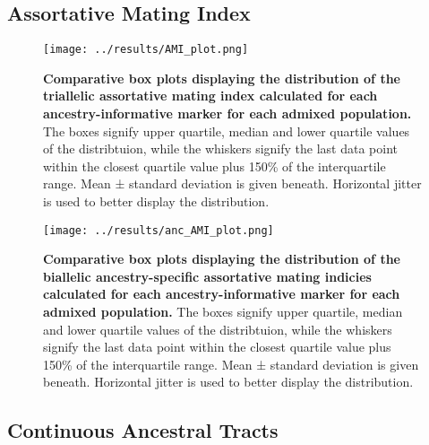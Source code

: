 \documentclass[11pt]{article}
\begin{document}
\subsection{Assortative Mating Index}


\begin{figure}[htb!]%
    \centering
    \texttt{[image: ../results/AMI\_plot.png]} 
    \vspace{.1cm}
    \caption{\textbf{
        Comparative box plots displaying the distribution of the triallelic assortative mating index calculated for each ancestry-informative marker for each admixed population.
    }
        The boxes signify upper quartile, median and lower quartile values of the distribtuion, while the whiskers signify the last data point within the closest quartile value plus 150\% of the interquartile range. Mean ± standard deviation is given beneath. Horizontal jitter is used to better display the distribution.
    }
\end{figure}



\begin{figure}[htb!]%
    \centering
    \texttt{[image: ../results/anc\_AMI\_plot.png]} 
    \vspace{.2cm}
    \caption{\textbf{
        Comparative box plots displaying the distribution of the biallelic ancestry-specific assortative mating indicies calculated for each ancestry-informative marker for each admixed population.
    }
        The boxes signify upper quartile, median and lower quartile values of the distribtuion, while the whiskers signify the last data point within the closest quartile value plus 150\% of the interquartile range. Mean ± standard deviation is given beneath. Horizontal jitter is used to better display the distribution.
    }
\end{figure}



\subsection{Continuous Ancestral Tracts}
\end{document}
